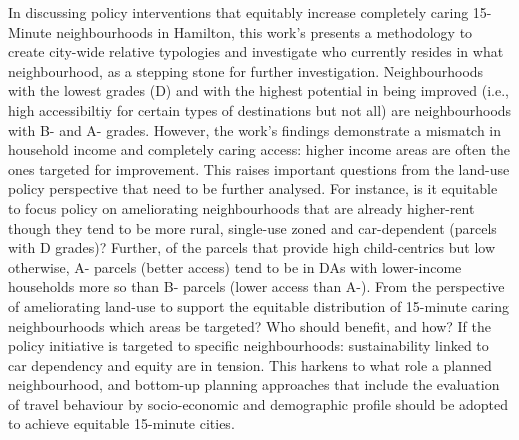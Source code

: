 \documentclass[
  authoryear,
  preprint,
  3p]{elsarticle}
\begin{document}
In discussing policy interventions that equitably increase completely
caring 15-Minute neighbourhoods in Hamilton, this work's presents a
methodology to create city-wide relative typologies and investigate who
currently resides in what neighbourhood, as a stepping stone for further
investigation. Neighbourhoods with the lowest grades (D) and with the
highest potential in being improved (i.e., high accessibiltiy for
certain types of destinations but not all) are neighbourhoods with B-
and A- grades. However, the work's findings demonstrate a mismatch in
household income and completely caring access: higher income areas are
often the ones targeted for improvement. This raises important questions
from the land-use policy perspective that need to be further analysed.
For instance, is it equitable to focus policy on ameliorating
neighbourhoods that are already higher-rent though they tend to be more
rural, single-use zoned and car-dependent (parcels with D grades)?
Further, of the parcels that provide high child-centrics but low
otherwise, A- parcels (better access) tend to be in DAs with
lower-income households more so than B- parcels (lower access than A-).
From the perspective of ameliorating land-use to support the equitable
distribution of 15-minute caring neighbourhoods which areas be targeted?
Who should benefit, and how? If the policy initiative is targeted to
specific neighbourhoods: sustainability linked to car dependency and
equity are in tension. This harkens to what role a planned
neighbourhood, and bottom-up planning approaches that include the
evaluation of travel behaviour by socio-economic and demographic profile
should be adopted to achieve equitable 15-minute cities.
\end{document}
